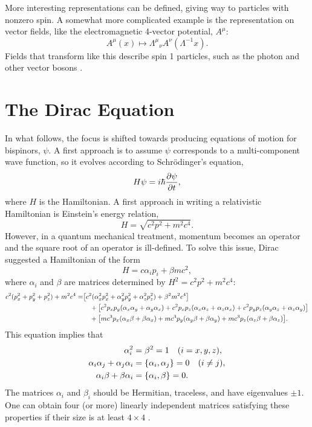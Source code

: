 More interesting representations can be defined, giving way to particles with nonzero spin. A somewhat more complicated example is the representation on vector fields, like the electromagnetic 4-vector potential, $A^\mu$:
\begin{equation}\label{eq:vector_Lorentz_trans}
    A^\mu(x) \longmapsto {\Lambda^{\mu}}_{\nu} A^{\nu} (\Lambda^{-1} x).
\end{equation}
Fields that transform like this describe spin 1 particles, such as the photon and other vector bosons \cite{peskin_introduction_1995}. 

\section{The Dirac Equation}\label{s:Dirac}

In what follows, the focus is shifted towards producing equations of motion for bispinors, $\psi$. A first approach is to assume $\psi$ corresponds to a multi-component wave function, so it evolves according to Schrödinger's equation,
\begin{equation}\label{eq:Schroedinger}
    H \psi = i\hbar \pdv{\psi}{t},
\end{equation}
where $H$ is the Hamiltonian. A first approach in writing a relativistic Hamiltonian is Einstein's energy relation, $$ H = \sqrt{c^2p^2+m^2c^4}.$$ However, in a quantum mechanical treatment, momentum becomes an operator and the square root of an operator is ill-defined. To solve this issue, Dirac suggested a Hamiltonian of the form $$H = c\alpha_ip_i+\beta mc^2,$$ where $\alpha_i$ and $\beta$ are matrices determined by $H^2 = c^2p^2 + m^2c^4$: 
\begin{align*}
    c^2(p_x^2+p_y^2+p_z^2) + m^2c^4 =& \qty[c^2(\alpha_x^2 p_x^2+\alpha_y^2 p_y^2+ \alpha_z^2 p_z^2)+\beta^2 m^2c^4]\\
    &\quad + \qty[c^2p_xp_y(\alpha_x\alpha_y+\alpha_y\alpha_x)+ c^2p_xp_z(\alpha_x\alpha_z+\alpha_z\alpha_x)+c^2p_yp_z(\alpha_y\alpha_z+\alpha_z\alpha_y)]\\
    &\quad + \qty[mc^3p_x(\alpha_x\beta+\beta\alpha_x)+mc^3p_y(\alpha_y\beta+\beta\alpha_y) + mc^3p_z(\alpha_z\beta+\beta\alpha_z)].
\end{align*}
This equation implies that
\begin{align*}
    \alpha_i^2 &= \beta^2 = 1 \quad (i=x,y,z),\\
    \alpha_i\alpha_j + \alpha_j \alpha_i &= \pb{\alpha_i}{\alpha_j} = 0 \quad (i\neq j),\\
    \alpha_i\beta +\beta \alpha_i &= \pb{\alpha_i}{\beta} = 0.
\end{align*}
The matrices $\alpha_i$ and $\beta_i$ should be Hermitian, traceless, and have eigenvalues $\pm 1$. One can obtain four (or more) linearly independent matrices satisfying these properties if their size is at least $4\times 4$ \cite{shankar_principles_1994}.

